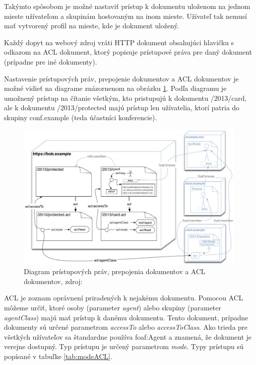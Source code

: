 \documentclass[thesis=M,slovak]{FITthesis}[2013/05/06]
\begin{document}
Takýmto spôsobom je možné nastaviť prístup k dokumentu uloženom na jednom mieste užívateľom a skupinám hostovaným na inom mieste. Užívateľ tak nemusí mať vytvorený profil na mieste, kde je dokument uložený.

Každý dopyt na webový zdroj vráti HTTP dokument obsahujúci hlavičku s odkazom na ACL dokument, ktorý popisuje prístupové práva pre daný dokument (prípadne pre iné dokumenty).
\cite{WebAccessControl}

Nastavenie prístupových práv, prepojenie dokumentov a ACL dokumentov je možné vidieť na diagrame znázornenom na obrázku \ref{graphics:WebACL}. Podľa diagramu je umožnený prístup na čítanie všetkým, kto pristupujú k dokumentu /2013/card, ale k dokumentu /2013/protected majú prístup len užívatelia, ktorí patria do skupiny conf.example (teda účastníci konferencie).

\begin{figure}\centering
	\includegraphics[width=1.0\textwidth]{stavy/WebACL.jpg}
 	\caption[Diagram WebACL]{Diagram prístupových práv, prepojenia dokumentov a ACL dokumentov, zdroj: \cite{WebAccessControl}}\label{graphics:WebACL}
\end{figure}

ACL je zoznam oprávnení priradených k nejakému dokumentu. Pomocou ACL môžeme určiť, ktoré osoby (parameter {\em agent}) alebo skupiny (parameter {\em agentClass}) majú mať prístup k danému dokumentu. Tento dokument, prípadne dokumenty sú určené parametrom {\em accessTo} alebo {\em accessToClass}. Ako trieda pre všetkých užívateľov sa štandardne používa foaf:Agent a znamená, že dokument je verejne dostupný.
Typ prístupu je určený parametrom {\em mode}. Typy prístupu sú popísané v tabuľke \ref{tab:modeACL}.
\end{document}
